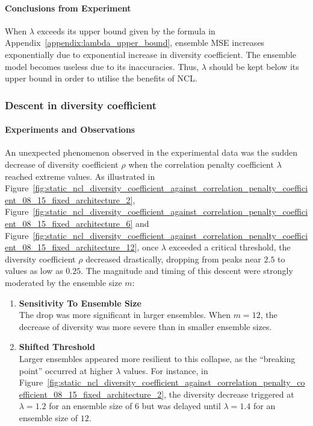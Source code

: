 \documentclass{article}
\begin{document}
\paragraph{Conclusions from Experiment}
When $\lambda$ exceeds its upper bound given by the formula in Appendix~\ref{appendix:lambda_upper_bound}, ensemble MSE increases exponentially due to exponential increase in diversity coefficient. The ensemble model becomes useless due to its inaccuracies. Thus, $\lambda$ should be kept below its upper bound in order to utilise the benefits of NCL. 


\subsubsection{Descent in diversity coefficient}
\paragraph{Experiments and Observations}
An unexpected phenomenon observed in the experimental data was the sudden decrease of diversity coefficient $\rho$ when the correlation penalty coefficient $\lambda$ reached extreme values. As illustrated in Figure~\ref{fig:static_ncl_diversity_coefficient_against_correlation_penalty_coefficient_08_15_fixed_architecture_2}, Figure~\ref{fig:static_ncl_diversity_coefficient_against_correlation_penalty_coefficient_08_15_fixed_architecture_6} and Figure~\ref{fig:static_ncl_diversity_coefficient_against_correlation_penalty_coefficient_08_15_fixed_architecture_12}, once $\lambda$ exceeded a critical threshold, the diversity coefficient $\rho$ decreased drastically, dropping from peaks near $2.5$ to values as low as $0.25$. The magnitude and timing of this descent were strongly moderated by the ensemble size $m$: 

\begin{enumerate}
    \item \textbf{Sensitivity To Ensemble Size} \\
    The drop was more significant in larger ensembles. When $m = 12$, the decrease of diversity was more severe than in smaller ensemble sizes. 

    \item \textbf{Shifted Threshold} \\
    Larger ensembles appeared more resilient to this collapse, as the ``breaking point'' occurred at higher $\lambda$ values. For instance, in Figure~\ref{fig:static_ncl_diversity_coefficient_against_correlation_penalty_coefficient_08_15_fixed_architecture_2}, the diversity decrease triggered at $\lambda = 1.2$ for an ensemble size of $6$ but was delayed until $\lambda = 1.4$ for an ensemble size of $12$. 
\end{enumerate}
\end{document}
